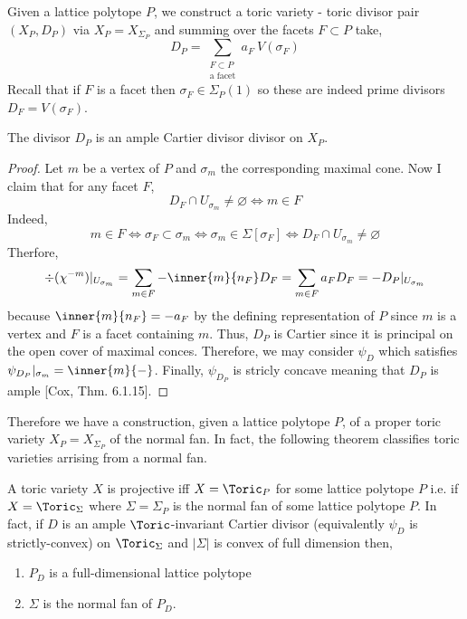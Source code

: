 \documentclass[12pt]{article}
\begin{document}
\begin{definition}
Given a lattice polytope $P$, we construct a toric variety - toric divisor pair $(X_P, D_P)$ via $X_P = X_{\Sigma_P}$ and summing over the facets $F \subset P$ take,
\[ D_P = \sum_{\substack{F \subset P \\ \text{a facet}}} a_F \: V(\sigma_F) \]
Recall that if $F$ is a facet then $\sigma_F \in \Sigma_P(1)$ so these are indeed prime divisors $D_F = V(\sigma_F)$.
\end{definition}

\begin{proposition} \label{polytope_div_ample}
The divisor $D_P$ is an ample Cartier divisor divisor on $X_P$.
\end{proposition}

\begin{proof}
Let $m$ be a vertex of $P$ and $\sigma_m$ the corresponding maximal cone. Now I claim that for any facet $F$,
\[ D_F \cap U_{\sigma_m} \neq \varnothing \iff m \in F \]
Indeed,
\[ m \in F \iff \sigma_F \subset \sigma_m \iff \sigma_m \in \Sigma[\sigma_F] \iff D_F \cap U_{\sigma_m} \neq \varnothing \]
Therfore,
\[ \div{(\chi^{-m})} |_{U_{\sigma_m}} = \sum_{m \in F} - \inner{m}{n_F} D_F = \sum_{m \in F} a_F D_F  = - D_P |_{U_{\sigma_m}} \]
because $\inner{m}{n_F} = - a_F$ by the defining representation of $P$ since $m$ is a vertex and $F$ is a facet containing $m$.
Thus, $D_P$ is Cartier since it is principal on the open cover of maximal conces. Therefore, we may consider $\psi_D$ which satisfies $\psi_{D_P} |_{\sigma_m} = \inner{m}{-}$. Finally, $\psi_{D_P}$ is stricly concave meaning that $D_P$ is ample [Cox, Thm. 6.1.15].
\end{proof}

\begin{remark}
Therefore we have a construction, given a lattice polytope $P$, of a proper toric variety $X_P = X_{\Sigma_P}$ of the normal fan. In fact, the following theorem classifies toric varieties arrising from a normal fan.
\end{remark}


\begin{theorem} \label{projective_normal_fan}
A toric variety $X$ is projective iff $X = \Toric_P$ for some lattice polytope $P$ i.e. if $X = \Toric_\Sigma$ where $\Sigma = \Sigma_P$ is the normal fan of some lattice polytope $P$. In fact, if $D$ is an ample $\Toric$-invariant Cartier divisor (equivalently $\psi_D$ is strictly-convex) on $\Toric_\Sigma$ and $|\Sigma|$ is convex of full dimension then,
\begin{enumerate}
\item $P_D$ is a full-dimensional lattice polytope
\item $\Sigma$ is the normal fan of $P_D$. 
\end{enumerate}
\end{theorem}
\end{document}
